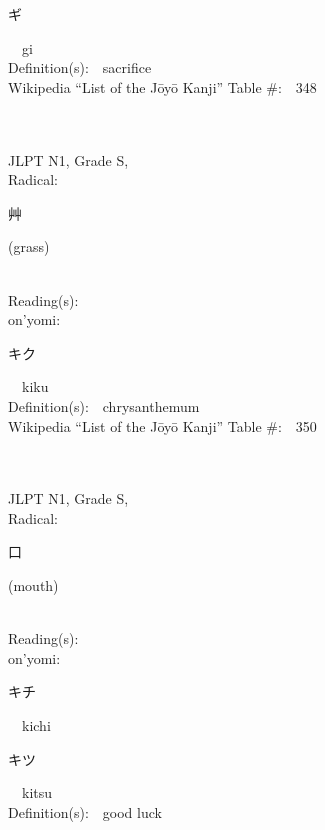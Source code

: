 \begin{multicols}{2}
{\hspace*{2em}}{\begin{CJK}{UTF8}{min} ギ \end{CJK}}\ \ gi\ \ \\
Definition(s):\ \ sacrifice \\
Wikipedia ``List of the J\=oy\=o Kanji'' Table \#:\ \ 348 \\
\ \ \\
{\fontsize{34pt}{40pt}  }\ \ \\
{JLPT N1, Grade S, \\Radical:\ \ {\begin{CJK}{UTF8}{min} 艸 \end{CJK}} (grass) } \\
Reading(s):\ \ \\
{\hspace*{1em}}on'yomi:\ \ \\
{\hspace*{2em}}{\begin{CJK}{UTF8}{min} キク \end{CJK}}\ \ kiku\ \ \\
Definition(s):\ \ chrysanthemum \\
Wikipedia ``List of the J\=oy\=o Kanji'' Table \#:\ \ 350 \\
\ \ \\
{\fontsize{34pt}{40pt}  }\ \ \\
{JLPT N1, Grade S, \\Radical:\ \ {\begin{CJK}{UTF8}{min} 口 \end{CJK}} (mouth) } \\
Reading(s):\ \ \\
{\hspace*{1em}}on'yomi:\ \ \\
{\hspace*{2em}}{\begin{CJK}{UTF8}{min} キチ \end{CJK}}\ \ kichi\ \ \\
{\hspace*{2em}}{\begin{CJK}{UTF8}{min} キツ \end{CJK}}\ \ kitsu\ \ \\
Definition(s):\ \ good luck \\

\end{multicols}
